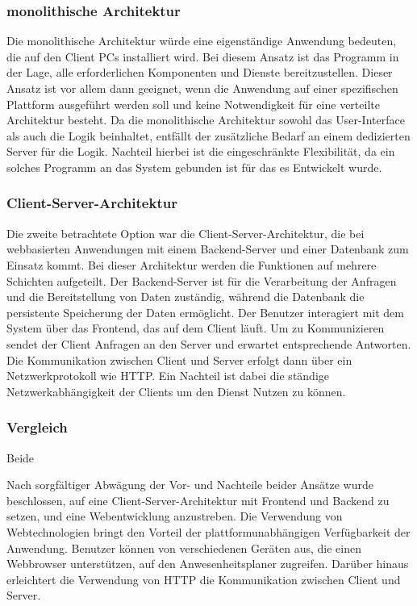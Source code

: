 \subsubsection{monolithische Architektur}
\label{sec:monolithisch}
Die monolithische Architektur würde eine eigenständige Anwendung bedeuten, die auf den Client PCs installiert wird. Bei diesem Ansatz ist das Programm in der Lage, alle erforderlichen Komponenten und Dienste bereitzustellen. Dieser Ansatz ist vor allem dann geeignet, wenn die Anwendung auf einer spezifischen Plattform ausgeführt werden soll und keine Notwendigkeit für eine verteilte Architektur besteht. Da die monolithische Architektur sowohl das User-Interface als auch die Logik beinhaltet, entfällt der zusätzliche Bedarf an einem dedizierten Server für die Logik. Nachteil hierbei ist die eingeschränkte Flexibilität, da ein solches Programm an das System gebunden ist für das es Entwickelt wurde.

\subsubsection{Client-Server-Architektur}
\label{sec:ClientServer}
Die zweite betrachtete Option war die Client-Server-Architektur, die bei webbasierten Anwendungen mit einem Backend-Server und einer Datenbank zum Einsatz kommt. Bei dieser Architektur werden die Funktionen auf mehrere Schichten aufgeteilt. Der Backend-Server ist für die Verarbeitung der Anfragen und die Bereitstellung von Daten zuständig, während die Datenbank die persistente Speicherung der Daten ermöglicht. Der Benutzer interagiert mit dem System über das Frontend, das auf dem Client läuft. Um zu Kommunizieren sendet der Client Anfragen an den Server und erwartet entsprechende Antworten. Die Kommunikation zwischen Client und Server erfolgt dann über ein Netzwerkprotokoll wie HTTP. Ein Nachteil ist dabei die ständige Netzwerkabhängigkeit der Clients um den Dienst Nutzen zu können.

\subsubsection{Vergleich}
\label{sec:Vergleich}
Beide %

Nach sorgfältiger Abwägung der Vor- und Nachteile beider Ansätze wurde beschlossen, auf eine Client-Server-Architektur mit Frontend und Backend zu setzen, und eine Webentwicklung anzustreben. Die Verwendung von Webtechnologien bringt den Vorteil der plattformunabhängigen Verfügbarkeit der Anwendung. Benutzer können von verschiedenen Geräten aus, die einen Webbrowser unterstützen, auf den Anwesenheitsplaner zugreifen. Darüber hinaus erleichtert die Verwendung von HTTP die Kommunikation zwischen Client und Server.

